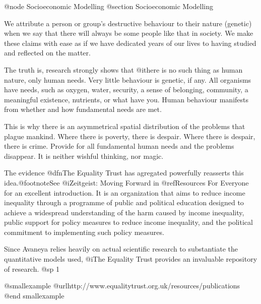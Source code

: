 @node Socioeconomic Modelling
@section Socioeconomic Modelling

We attribute a person or group's destructive behaviour to their nature (genetic) when we say that there will always be some people like that in society. We make these claims with ease as if we have dedicated years of our lives to having studied and reflected on the matter.

The truth is, research strongly shows that @i{there is no such thing as human nature, only human needs}. Very little behaviour is genetic, if any. All organisms have needs, such as oxygen, water, security, a sense of belonging, community, a meaningful existence, nutrients, or what have you. Human behaviour manifests from whether and how fundamental needs are met.

This is why there is an asymmetrical spatial distribution of the problems that plague mankind. Where there is poverty, there is despair. Where there is despair, there is crime. Provide for all fundamental human needs and the problems disappear. It is neither wishful thinking, nor magic.

The evidence @dfn{The Equality Trust} has agregated powerfully reasserts this idea.@footnote{See @i{Zeitgeist: Moving Forward} in @ref{Resources For Everyone} for an excellent introduction.} It is an organization that aims to reduce income inequality through a programme of public and political education designed to achieve a widespread understanding of the harm caused by income inequality, public support for policy measures to reduce income inequality, and the political commitment to implementing such policy measures. 

Since Avaneya relies heavily on actual scientific research to substantiate the quantitative models used, @i{The Equality Trust} provides an invaluable repository of research.
@sp 1

@smallexample
@url{http://www.equalitytrust.org.uk/resources/publications}
@end smallexample

